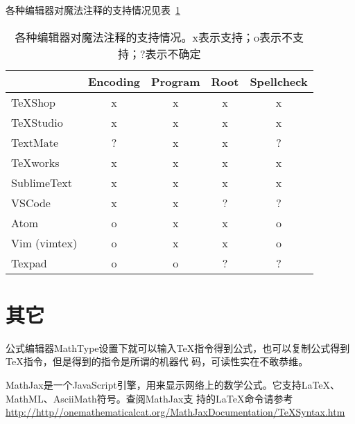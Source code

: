 各种编辑器对魔法注释的支持情况见表~\ref{magiccommands}
\begin{table}
  \centering
  \caption{各种编辑器对魔法注释的支持情况。x表示支持；o表示不支持；?表示不确定}\label{magiccommands}
  \begin{tabular}{|l|*{4}{c|}}
    \hline
    & Encoding & Program & Root & Spellcheck \\
    \hline
    TeXShop & x  & x & x & x \\
    \hline
    TeXStudio & x & x & x & x \\
    \hline
    TextMate & ? & x & x & ? \\
    \hline
    TeXworks & x & x & x & x \\
    \hline
    SublimeText  & x & x & x & x \\ 
    \hline
    VSCode & x & x & ? & ? \\
    \hline
    Atom & o & x & x & o \\
    \hline
    Vim
    (vimtex) & o & x & x & o \\ 
    \hline
    Texpad & o & o & ? & ? \\
    \hline
  \end{tabular}
\end{table}

\section{其它}




公式编辑器MathType设置下就可以输入TeX指令得到公式，也可以复制公式得到TeX指令，但是得到的指令是所谓的机器代
码，可读性实在不敢恭维。

MathJax是一个JavaScript引擎，用来显示网络上的数学公式。它支持LaTeX、MathML、AsciiMath符号。查阅MathJax支
持的LaTeX命令请参考\url{http://http//onemathematicalcat.org/MathJaxDocumentation/TeXSyntax.htm}